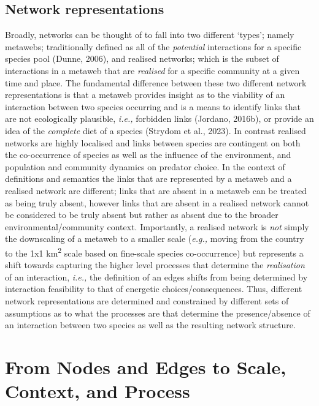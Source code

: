 \documentclass[
]{article}
\begin{document}
\subsection{Network representations}\label{network-representations}

Broadly, networks can be thought of to fall into two different `types';
namely metawebs; traditionally defined as all of the \emph{potential}
interactions for a specific species pool (Dunne, 2006), and realised
networks; which is the subset of interactions in a metaweb that are
\emph{realised} for a specific community at a given time and place. The
fundamental difference between these two different network
representations is that a metaweb provides insight as to the viability
of an interaction between two species occurring and is a means to
identify links that are not ecologically plausible, \emph{i.e.,}
forbidden links (Jordano, 2016b), or provide an idea of the
\emph{complete} diet of a species (Strydom et al., 2023). In contrast
realised networks are highly localised and links between species are
contingent on both the co-occurrence of species as well as the influence
of the environment, and population and community dynamics on predator
choice. In the context of definitions and semantics the links that are
represented by a metaweb and a realised network are different; links
that are absent in a metaweb can be treated as being truly absent,
however links that are absent in a realised network cannot be considered
to be truly absent but rather as absent due to the broader
environmental/community context. Importantly, a realised network is
\emph{not} simply the downscaling of a metaweb to a smaller scale
(\emph{e.g.,} moving from the country to the 1x1 km\textsuperscript{2}
scale based on fine-scale species co-occurrence) but represents a shift
towards capturing the higher level processes that determine the
\emph{realisation} of an interaction, \emph{i.e.,} the definition of an
edges shifts from being determined by interaction feasibility to that of
energetic choices/consequences. Thus, different network representations
are determined and constrained by different sets of assumptions as to
what the processes are that determine the presence/absence of an
interaction between two species as well as the resulting network
structure.

\section{From Nodes and Edges to Scale, Context, and
Process}\label{sec-process}
\end{document}
